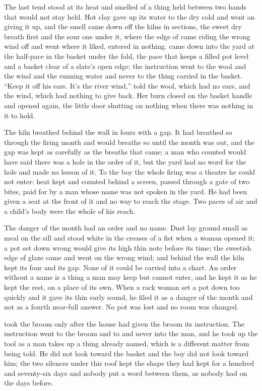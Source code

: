 
The last tend stood at its heat and  smelled of a thing held between two hands that would not stay held. Hot clay gave up its water to the dry cold and went on giving it up, and the smell came down off the kilns in sections, the sweet dry breath first and the sour one under it, where the edge of  came riding the wrong wind off  and went where it liked, entered in nothing.  came down into the yard at the half-pace in the basket under the fold, the pace that keeps a filled pot level and a basket clear of a slate's open edge; the instruction went to the wool and the wind and the running water and never to the thing carried in the basket. “Keep it off his ears. It's the river wind,”  told the wool, which had no ears, and the wind, which had nothing to give back. Her burn closed on the basket handle and opened again, the little door shutting on nothing when there was nothing in it to hold.

The kiln breathed behind the wall in fours with a gap. It had breathed so through the firing month and would breathe so until the month was out, and the gap was kept as carefully as the breaths that came; a man who counted would have said there was a hole in the order of it, but the yard had no word for the hole and made no lesson of it. To the boy the whole firing was a theatre he could not enter: heat kept and counted behind a screen, passed through a gate of two bites, paid for by a man whose name was not spoken in the yard. He had been given a seat at the front of it and no way to reach the stage. Two paces of air and a child's body were the whole of his reach.

The danger of the month had an order and no name. Dust lay ground small as meal on the sill and stood white in the creases of a fist when a woman opened it; a pot set down wrong would give its high thin note before its time; the sweetish edge of glaze came and went on the wrong wind; and behind the wall the kiln kept its four and its gap. None of it could be carried into a chart. An order without a name is a thing a man may keep but cannot enter, and he kept it as he kept the rest, on a place of its own. When a rack woman set a pot down too quickly and it gave its thin early sound, he filed it as a danger of the month and not as a fourth near-full answer. No pot was lost and no room was changed.

 took the broom only after the house had given the broom its instruction. The instruction went to the broom and to  and never into the man, and he took up the tool as a man takes up a thing already named, which is a different matter from being told. He did not look toward the basket and the boy did not look toward him; the two silences under this roof kept the shape they had kept for a hundred and seventy-six days and nobody put a word between them, as nobody had on the days before.

